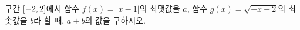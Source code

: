 구간 $[-2{,}\mkern3mu\mathopen{}2]$에서 함수 $f(x)=|x-1|$의 최댓값을 $a$, 함수 $g(x)=\sqrt{-x+2}$의 최솟값을 $b$라 할 때, $a+b$의 값을 구하시오.
